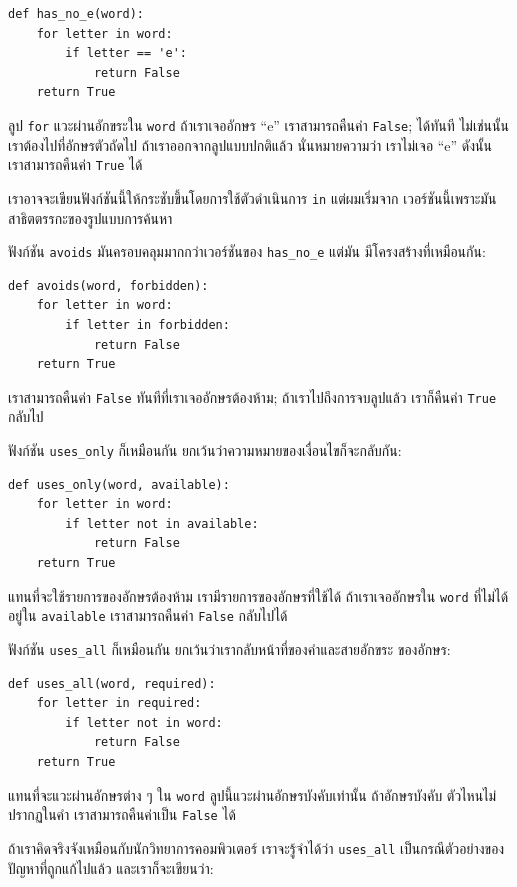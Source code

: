 \begin{verbatim}
def has_no_e(word):
    for letter in word:
        if letter == 'e':
            return False
    return True
\end{verbatim}
%
ลูป {\tt for} แวะผ่านอักขระใน {\tt word} ถ้าเราเจออักษร ``e'' เราสามารถคืนค่า {\tt False};
ได้ทันที ไม่เช่นนั้น เราต้องไปที่อักษรตัวถัดไป  ถ้าเราออกจากลูปแบบปกติแล้ว นั่นหมายความว่า
เราไม่เจอ ``e'' ดังนั้น เราสามารถคืนค่า {\tt True} ได้


เราอาจจะเขียนฟังก์ชันนี้ให้กระชับขึ้นโดยการใช้ตัวดำเนินการ {\tt in} แต่ผมเริ่มจาก
เวอร์ชันนี้เพราะมันสาธิตตรรกะของรูปแบบการค้นหา

ฟังก์ชัน {\tt avoids} มันครอบคลุมมากกว่าเวอร์ชันของ \verb"has_no_e" แต่มัน
มีโครงสร้างที่เหมือนกัน:

\begin{verbatim}
def avoids(word, forbidden):
    for letter in word:
        if letter in forbidden:
            return False
    return True
\end{verbatim}
%
เราสามารถคืนค่า {\tt False} ทันทีที่เราเจออักษรต้องห้าม; ถ้าเราไปถึงการจบลูปแล้ว
เราก็คืนค่า {\tt True} กลับไป

ฟังก์ชัน \verb"uses_only" ก็เหมือนกัน ยกเว้นว่าความหมายของเงื่อนไขก็จะกลับกัน: 

\begin{verbatim}
def uses_only(word, available):
    for letter in word: 
        if letter not in available:
            return False
    return True
\end{verbatim}
%
แทนที่จะใช้รายการของอักษรต้องห้าม เรามีรายการของอักษรที่ใช้ได้ ถ้าเราเจออักษรใน 
{\tt word} ที่ไม่ได้อยู่ใน {\tt available} เราสามารถคืนค่า {\tt False} 
กลับไปได้

ฟังก์ชัน \verb"uses_all" ก็เหมือนกัน ยกเว้นว่าเรากลับหน้าที่ของคำและสายอักขระ
ของอักษร:

\begin{verbatim}
def uses_all(word, required):
    for letter in required: 
        if letter not in word:
            return False
    return True
\end{verbatim}
%
แทนที่จะแวะผ่านอักษรต่าง ๆ ใน {\tt word} ลูปนี้แวะผ่านอักษรบังคับเท่านั้น ถ้าอักษรบังคับ
ตัวไหนไม่ปรากฏในคำ เราสามารถคืนค่าเป็น {\tt False} ได้

ถ้าเราคิดจริงจังเหมือนกับนักวิทยาการคอมพิวเตอร์ เราจะรู้จำได้ว่า \verb"uses_all"
เป็นกรณีตัวอย่างของปัญหาที่ถูกแก้ไปแล้ว และเราก็จะเขียนว่า:

